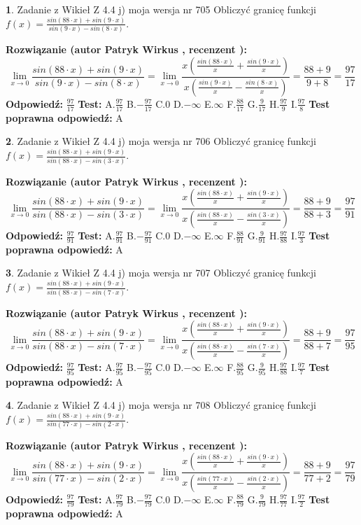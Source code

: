 \documentclass[12pt, a4paper]{article}
\theoremstyle{definition} %
\newtheorem{zad}{}
\newcommand{\zadStart}[1]{\begin{zad}#1\newline}
\newcommand{\zadStop}{\end{zad}}
\newcommand{\rozwStart}[2]{\noindent \textbf{Rozwiązanie (autor #1 , recenzent #2): }\newline}
\newcommand{\rozwStop}{\newline}
\newcommand{\odpStart}{\noindent \textbf{Odpowiedź:}\newline}
\newcommand{\odpStop}{\newline}
\newcommand{\testStart}{\noindent \textbf{Test:}\newline}
\newcommand{\testStop}{\newline}
\newcommand{\kluczStart}{\noindent \textbf{Test poprawna odpowiedź:}\newline}
\newcommand{\kluczStop}{\newline}
\begin{document}
\zadStart{Zadanie z Wikieł Z 4.4 j) moja wersja nr 705}
Obliczyć granicę funkcji $f(x)=\frac{sin(88\cdot x) +sin(9\cdot x)}{sin(9\cdot x) -sin(8\cdot x)}$.
\zadStop
\rozwStart{Patryk Wirkus}{}
$$\lim\limits_{x\to 0}\frac{sin(88\cdot x) +sin(9\cdot x)}{sin(9\cdot x) -sin(8\cdot x)}=\lim\limits_{x\to 0}\frac{x(\frac{sin(88\cdot x)}{x}+\frac{sin(9\cdot x)}{x})}{x(\frac{sin(9\cdot x)}{x}-\frac{sin(8\cdot x)}{x})}=\frac{88+9}{9+8} = \frac{97}{17}$$
\rozwStop
\odpStart
$\frac{97}{17}$
\odpStop
\testStart
A.$\frac{97}{17}$
B.$-\frac{97}{17}$
C.$0$
D.$-\infty$
E.$\infty$
F.$\frac{88}{17}$
G.$\frac{9}{17}$
H.$\frac{97}{9}$
I.$\frac{97}{8}$
\testStop
\kluczStart
A
\kluczStop



\zadStart{Zadanie z Wikieł Z 4.4 j) moja wersja nr 706}
Obliczyć granicę funkcji $f(x)=\frac{sin(88\cdot x) +sin(9\cdot x)}{sin(88\cdot x) -sin(3\cdot x)}$.
\zadStop
\rozwStart{Patryk Wirkus}{}
$$\lim\limits_{x\to 0}\frac{sin(88\cdot x) +sin(9\cdot x)}{sin(88\cdot x) -sin(3\cdot x)}=\lim\limits_{x\to 0}\frac{x(\frac{sin(88\cdot x)}{x}+\frac{sin(9\cdot x)}{x})}{x(\frac{sin(88\cdot x)}{x}-\frac{sin(3\cdot x)}{x})}=\frac{88+9}{88+3} = \frac{97}{91}$$
\rozwStop
\odpStart
$\frac{97}{91}$
\odpStop
\testStart
A.$\frac{97}{91}$
B.$-\frac{97}{91}$
C.$0$
D.$-\infty$
E.$\infty$
F.$\frac{88}{91}$
G.$\frac{9}{91}$
H.$\frac{97}{88}$
I.$\frac{97}{3}$
\testStop
\kluczStart
A
\kluczStop



\zadStart{Zadanie z Wikieł Z 4.4 j) moja wersja nr 707}
Obliczyć granicę funkcji $f(x)=\frac{sin(88\cdot x) +sin(9\cdot x)}{sin(88\cdot x) -sin(7\cdot x)}$.
\zadStop
\rozwStart{Patryk Wirkus}{}
$$\lim\limits_{x\to 0}\frac{sin(88\cdot x) +sin(9\cdot x)}{sin(88\cdot x) -sin(7\cdot x)}=\lim\limits_{x\to 0}\frac{x(\frac{sin(88\cdot x)}{x}+\frac{sin(9\cdot x)}{x})}{x(\frac{sin(88\cdot x)}{x}-\frac{sin(7\cdot x)}{x})}=\frac{88+9}{88+7} = \frac{97}{95}$$
\rozwStop
\odpStart
$\frac{97}{95}$
\odpStop
\testStart
A.$\frac{97}{95}$
B.$-\frac{97}{95}$
C.$0$
D.$-\infty$
E.$\infty$
F.$\frac{88}{95}$
G.$\frac{9}{95}$
H.$\frac{97}{88}$
I.$\frac{97}{7}$
\testStop
\kluczStart
A
\kluczStop



\zadStart{Zadanie z Wikieł Z 4.4 j) moja wersja nr 708}
Obliczyć granicę funkcji $f(x)=\frac{sin(88\cdot x) +sin(9\cdot x)}{sin(77\cdot x) -sin(2\cdot x)}$.
\zadStop
\rozwStart{Patryk Wirkus}{}
$$\lim\limits_{x\to 0}\frac{sin(88\cdot x) +sin(9\cdot x)}{sin(77\cdot x) -sin(2\cdot x)}=\lim\limits_{x\to 0}\frac{x(\frac{sin(88\cdot x)}{x}+\frac{sin(9\cdot x)}{x})}{x(\frac{sin(77\cdot x)}{x}-\frac{sin(2\cdot x)}{x})}=\frac{88+9}{77+2} = \frac{97}{79}$$
\rozwStop
\odpStart
$\frac{97}{79}$
\odpStop
\testStart
A.$\frac{97}{79}$
B.$-\frac{97}{79}$
C.$0$
D.$-\infty$
E.$\infty$
F.$\frac{88}{79}$
G.$\frac{9}{79}$
H.$\frac{97}{77}$
I.$\frac{97}{2}$
\testStop
\kluczStart
A
\kluczStop
\end{document}
